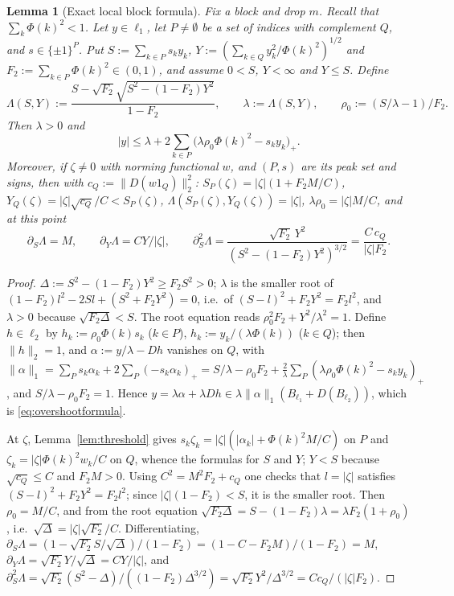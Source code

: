 \documentclass[10pt]{amsart}
\newtheorem{lemma}[theorem]{Lemma}
\theoremstyle{definition}
\theoremstyle{remark}
\begin{document}
\begin{lemma}[Exact local block formula]\label{lem:localformula}
Fix a block and drop $m$.  Recall that $\sum_k\Phi(k)^2<1$.  Let $y\in\ell_1$, let
$P\ne\emptyset$ be a set of indices with complement $Q$, and
$s\in\{\pm1\}^P$.  Put $S:=\sum_{k\in P}s_ky_k$,
$Y:=(\sum_{k\in Q}y_k^2/\Phi(k)^2)^{1/2}$ and $F_2:=\sum_{k\in P}\Phi(k)^2\in
(0,1)$, and assume $0<S$, $Y<\infty$ and $Y\le S$.  Define
\[
 \Lambda(S,Y):=\frac{S-\sqrt{F_2}\sqrt{S^2-(1-F_2)Y^2}}{1-F_2},\qquad
 \lambda:=\Lambda(S,Y),\qquad \rho_0:=(S/\lambda-1)/F_2 .
\]
Then $\lambda>0$ and
\begin{equation}\label{eq:overshootformula}
 |y|\le\lambda+2\sum_{k\in P}\big(\lambda\rho_0\Phi(k)^2-s_ky_k\big)_+ .
\end{equation}
Moreover, if $\zeta\ne0$ with norming functional $w$, and $(P,s)$ are its
peak set and signs, then with $c_Q:=\|D(w1_Q)\|_2^2$:
$S_P(\zeta)=|\zeta|(1+F_2M/C)$, $Y_Q(\zeta)=|\zeta|\sqrt{c_Q}/C<S_P(\zeta)$,
$\Lambda(S_P(\zeta),Y_Q(\zeta))=|\zeta|$, $\lambda\rho_0=|\zeta|M/C$, and at
this point
\[
 \partial_S\Lambda=M,\qquad \partial_Y\Lambda=CY/|\zeta|,\qquad
 \partial_S^2\Lambda=\frac{\sqrt{F_2}\,Y^2}{(S^2-(1-F_2)Y^2)^{3/2}}
 =\frac{C\,c_Q}{|\zeta|F_2}.
\]
\end{lemma}

\begin{proof}
$\Delta:=S^2-(1-F_2)Y^2\ge F_2S^2>0$; $\lambda$ is the smaller root of
$(1-F_2)l^2-2Sl+(S^2+F_2Y^2)=0$, i.e.\ of $(S-l)^2+F_2Y^2=F_2l^2$, and
$\lambda>0$ because $\sqrt{F_2\Delta}<S$.  The root equation reads
$\rho_0^2F_2+Y^2/\lambda^2=1$.  Define $h\in\ell_2$ by
$h_k:=\rho_0\Phi(k)s_k$ ($k\in P$), $h_k:=y_k/(\lambda\Phi(k))$ ($k\in Q$);
then $\|h\|_2=1$, and $\alpha:=y/\lambda-Dh$ vanishes on $Q$, with
$\|\alpha\|_1=\sum_Ps_k\alpha_k+2\sum_P(-s_k\alpha_k)_+=S/\lambda-\rho_0F_2
+\frac2\lambda\sum_P(\lambda\rho_0\Phi(k)^2-s_ky_k)_+$, and
$S/\lambda-\rho_0F_2=1$.  Hence $y=\lambda\alpha+\lambda Dh\in\lambda
\|\alpha\|_1(B_{\ell_1}+D(B_{\ell_2}))$, which is \eqref{eq:overshootformula}.

At $\zeta$, Lemma~\ref{lem:threshold} gives $s_k\zeta_k=|\zeta|(|\alpha_k|+
\Phi(k)^2M/C)$ on $P$ and $\zeta_k=|\zeta|\Phi(k)^2w_k/C$ on $Q$, whence
the formulas for $S$ and $Y$; $Y<S$ because $\sqrt{c_Q}\le C$ and $F_2M>0$.
Using $C^2=M^2F_2+c_Q$ one checks that $l=|\zeta|$ satisfies
$(S-l)^2+F_2Y^2=F_2l^2$; since $|\zeta|(1-F_2)<S$, it is the smaller root.
Then $\rho_0=M/C$, and from the root equation
$\sqrt{F_2\Delta}=S-(1-F_2)\lambda=\lambda F_2(1+\rho_0)$, i.e.\
$\sqrt\Delta=|\zeta|\sqrt{F_2}/C$.  Differentiating,
$\partial_S\Lambda=(1-\sqrt{F_2}S/\sqrt\Delta)/(1-F_2)=(1-C-F_2M)/(1-F_2)=M$,
$\partial_Y\Lambda=\sqrt{F_2}Y/\sqrt\Delta=CY/|\zeta|$, and
$\partial^2_S\Lambda=\sqrt{F_2}(S^2-\Delta)/((1-F_2)\Delta^{3/2})=
\sqrt{F_2}Y^2/\Delta^{3/2}=Cc_Q/(|\zeta|F_2)$.
\end{proof}
\end{document}
